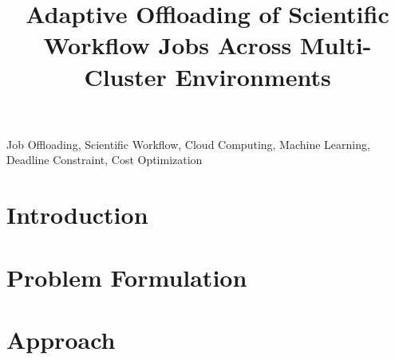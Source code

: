 \documentclass[conference]{IEEEtran}
\begin{document}
\title{Adaptive Offloading
of Scientific Workflow Jobs
Across Multi-Cluster Environments}

\author{



}


\maketitle

\begin{abstract}

\end{abstract}


\begin{IEEEkeywords}
Job Offloading, Scientific Workflow, Cloud Computing, Machine Learning, Deadline Constraint, Cost Optimization
\end{IEEEkeywords}

\section{Introduction} %
\label{sec:introduction}


\section{Problem Formulation}
\label{sec:problem}


\section{Approach}
\label{sec:approach}

\end{document}
